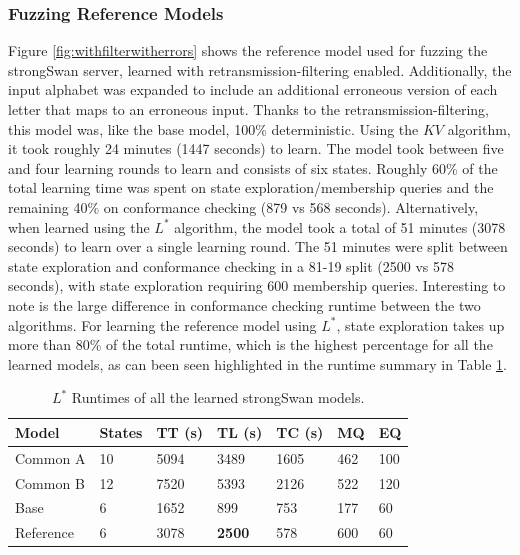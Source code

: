 \subsubsection*{Fuzzing Reference Models}
Figure \ref{fig:withfilterwitherrors} shows the reference model used for fuzzing the strongSwan server, learned with retransmission-filtering enabled. Additionally, the input alphabet was expanded to include an additional erroneous version of each letter that maps to an erroneous input. Thanks to the retransmission-filtering, this model was, like the base model, 100\% deterministic. Using the $KV$ algorithm, it took roughly 24 minutes (1447 seconds) to learn. The model took between five and four learning rounds to learn and consists of six states. Roughly 60\% of the total learning time was spent on state exploration/membership queries and the remaining 40\% on conformance checking (879 vs 568 seconds). Alternatively, when learned using the $L^*$ algorithm, the model took a total of 51 minutes (3078 seconds) to learn over a single learning round. The 51 minutes were split between state exploration and conformance checking in a 81-19 split (2500 vs 578 seconds), with state exploration requiring 600 membership queries. Interesting to note is the large difference in conformance checking runtime between the two algorithms. For learning the reference model using $L^*$, state exploration takes up more than 80\% of the total runtime, which is the highest percentage for all the learned models, as can been seen highlighted in the runtime summary in Table \ref{tab:runtime_summary_lstar}.

\begin{table}[h]
	\centering
	\begin{tabular}{|l|l|l|l|l|l|l|}
		\hline
		\rowcolor[HTML]{C0C0C0} 
		Model     & States & TT (s)   & TL (s)   & TC (s)   & MQ  & EQ  \\ \hline
		Common A  & 10     & 5094 & 3489 & 1605 & 462 & 100 \\ \hline
		Common B  & 12     & 7520 & 5393 & 2126 & 522 & 120 \\ \hline
		Base      & 6      & 1652 & 899  & 753  & 177 & 60  \\ \hline
		Reference & 6      & 3078 & \textbf{2500} & 578  & 600 & 60  \\ \hline
	\end{tabular}
	\caption{$L^*$ Runtimes of all the learned strongSwan models.}
	\label{tab:runtime_summary_lstar}
\end{table}

